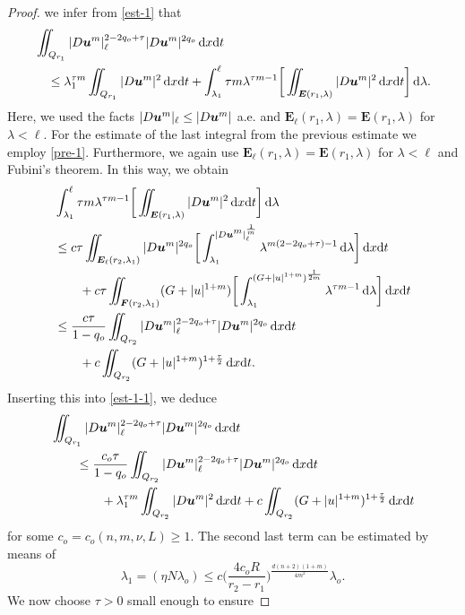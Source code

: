 \documentclass[a4paper, 10pt, american]{amsart}
\numberwithin{theorem}{section}
\numberwithin{equation}{section}
\newcommand{\dxdt}{\,\mathrm{d}x\mathrm{d}t}
\renewcommand{\d}{\,\mathrm{d}}
\newcommand{\power}[2]{\bm{#1^{\mbox{\unboldmath{\scriptsize$#2$}}}}}
\begin{document}
\begin{proof}
we infer from \eqref{est-1} that
\begin{align}\label{est-1-1}
&\iint_{Q_{r_1}}|D\power um|_\ell^{2-2q_o+\tau}|D\power um|^{2q_o}\dxdt\nonumber\\
&\quad\le
\lambda_1^{\tau m}\iint_{Q_{r_1}}|D\power um|^{2}\dxdt
+
\int_{\lambda_1}^\ell\tau m\lambda^{\tau m-1}\bigg[\iint_{\boldsymbol E(r_1,\lambda)}|D\power um|^{2}\dxdt\bigg]\d\lambda.
\end{align}
Here, we used the facts $|D\power um|_\ell\le|D\power um|$ a.e. and
$\boldsymbol E_\ell(r_1,\lambda)=\boldsymbol E(r_1,\lambda)$ for
$\lambda<\ell$.
For the estimate of the last integral from the previous estimate we
employ \eqref{pre-1}. Furthermore, we again use $\boldsymbol
E_\ell(r_1,\lambda)=\boldsymbol E(r_1,\lambda)$ for $\lambda<\ell$
and Fubini's theorem. In this way, we obtain
\begin{align*}
&\int_{\lambda_1}^\ell\tau m\lambda^{\tau m-1}\bigg[\iint_{\boldsymbol E(r_1,\lambda)}|D\power um|^{2}\dxdt\bigg]\d\lambda\\
&\le
c\tau\iint_{\boldsymbol E_\ell(r_2,\lambda_1)}|D\power um|^{2q_o}
\bigg[ \int_{\lambda_1}^{|D\power um|_\ell^\frac1m} \lambda^{m(2-2q_o+\tau)-1}\d\lambda\bigg]\dxdt\\
&\qquad+
c\tau\iint_{\boldsymbol F(r_2,\lambda_1)}(G+|u|^{1+m}) \bigg[ \int_{\lambda_1}^{(G+|u|^{1+m})^\frac1{2m}} \lambda^{\tau m -1}\d\lambda\bigg]\dxdt\\
&\le
\frac{c\tau}{1-q_o}\iint_{Q_{r_2}}|D\power um|_\ell^{2-2q_o+\tau}|D\power um|^{2q_o}\dxdt\\
&\qquad+
c\iint_{Q_{r_2}}(G+|u|^{1+m})^{1+\frac\tau2}\dxdt.
\end{align*}
Inserting this into \eqref{est-1-1}, we deduce 
\begin{align}
&\iint_{Q_{r_1}}|D\power um|_\ell^{2-2q_o+\tau}|D\power um|^{2q_o}\dxdt\nonumber\\
&\qquad\le
\frac{c_o\tau}{1-q_o}\iint_{Q_{r_2}}|D\power um|_\ell^{2-2q_o+\tau}|D\power um|^{2q_o}\dxdt\nonumber\\
&\qquad\qquad+
\lambda_1^{\tau m}\iint_{Q_{r_2}}|D\power um|^2\dxdt
+
c\iint_{Q_{r_2}}(G+|u|^{1+m})^{1+\frac\tau2}\dxdt
\end{align}
for some $c_o=c_o(n,m,\nu,L)\ge1$.
The second last term can be estimated by means of
\begin{equation*}
  \lambda_1=(\eta N\lambda_o)\le
  c\bigg(\frac{4c_oR}{r_2-r_1}\bigg)^{\frac{d(n+2)(1+m)}{4m^2}}\lambda_o.
\end{equation*}
We now choose $\tau>0$ small enough to ensure

\end{proof}
\end{document}

